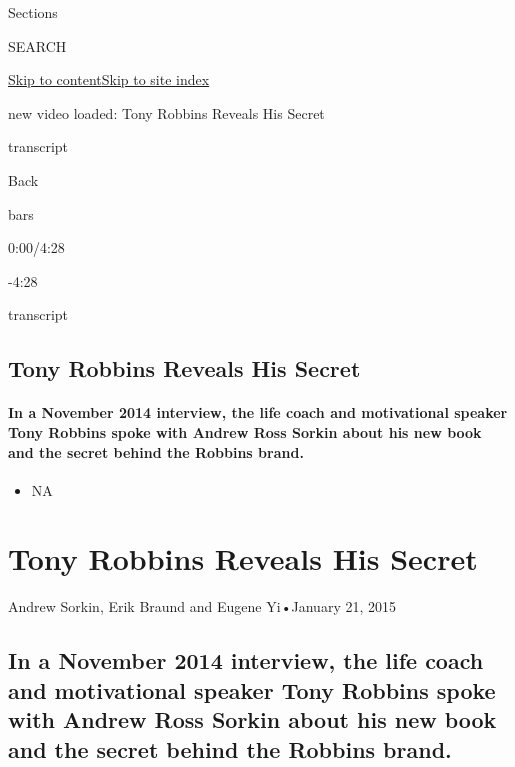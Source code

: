 Sections

SEARCH

\protect\hyperlink{site-content}{Skip to
content}\protect\hyperlink{site-index}{Skip to site index}

new video loaded: Tony Robbins Reveals His Secret

transcript

Back

bars

0:00/4:28

-4:28

transcript

\hypertarget{tony-robbins-reveals-his-secret}{%
\subsection{Tony Robbins Reveals His
Secret}\label{tony-robbins-reveals-his-secret}}

\hypertarget{in-a-november-2014-interview-the-life-coach-and-motivational-speaker-tony-robbins-spoke-with-andrew-ross-sorkin-about-his-new-book-and-the-secret-behind-the-robbins-brand}{%
\paragraph{In a November 2014 interview, the life coach and motivational
speaker Tony Robbins spoke with Andrew Ross Sorkin about his new book
and the secret behind the Robbins
brand.}\label{in-a-november-2014-interview-the-life-coach-and-motivational-speaker-tony-robbins-spoke-with-andrew-ross-sorkin-about-his-new-book-and-the-secret-behind-the-robbins-brand}}

\begin{itemize}
\tightlist
\item
  NA
\end{itemize}

\hypertarget{tony-robbins-reveals-his-secret-1}{%
\section{Tony Robbins Reveals His
Secret}\label{tony-robbins-reveals-his-secret-1}}

Andrew Sorkin, Erik Braund and Eugene Yi•January 21, 2015

\hypertarget{in-a-november-2014-interview-the-life-coach-and-motivational-speaker-tony-robbins-spoke-with-andrew-ross-sorkin-about-his-new-book-and-the-secret-behind-the-robbins-brand-1}{%
\subsection{In a November 2014 interview, the life coach and
motivational speaker Tony Robbins spoke with Andrew Ross Sorkin about
his new book and the secret behind the Robbins
brand.}\label{in-a-november-2014-interview-the-life-coach-and-motivational-speaker-tony-robbins-spoke-with-andrew-ross-sorkin-about-his-new-book-and-the-secret-behind-the-robbins-brand-1}}

